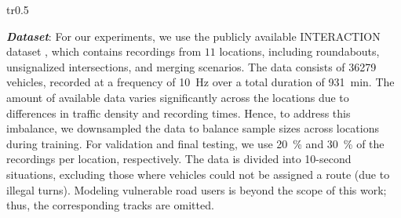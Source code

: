 \documentclass[a4paper,12pt,onecolumn]{article}
\begin{document}
\begin{wraptable}{tr}{0.5\textwidth} %
  \centering
  \vspace{-12pt} %
  \vspace{-10pt} %
  \caption{Training Parameters}
  \label{tab:training_parameter}
  \vspace{-12pt} %
\end{wraptable}

\textbf{\emph{Dataset}}: 
For our experiments, we use the publicly available INTERACTION dataset \cite{Zhan19}, which contains recordings from $11$ locations, including roundabouts, unsignalized intersections, and merging scenarios. The data consists of \num{36279} vehicles, recorded at a frequency of \SI{10}{Hz} over a total duration of \SI{931}{min}. The amount of available data varies significantly across the locations due to differences in traffic density and recording times. Hence, to address this imbalance, we downsampled the data to balance sample sizes across locations during training. For validation and final testing, we use \SI{20}{\%} and \SI{30}{\%} of the recordings per location, respectively. The data is divided into 10-second situations, excluding those where vehicles could not be assigned a route (\eg due to illegal turns). Modeling vulnerable road users is beyond the scope of this work; thus, the corresponding tracks are omitted.
\end{document}
